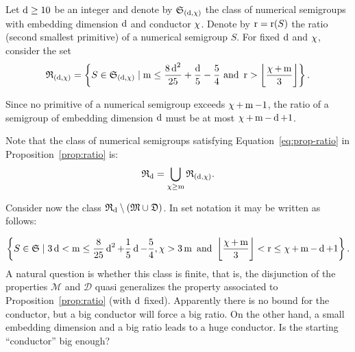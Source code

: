 Let $\operatorname{d}\ge 10$ be an integer and denote by $\mathfrak{S}_{(\operatorname{d},\operatorname{\chi})}$ the class of numerical semigroups with embedding dimension $\operatorname{d}$ and conductor $\operatorname{\chi}$. Denote by $\operatorname{r}=\operatorname{r}(S)$ the ratio (second smallest primitive) of a numerical semigroup $S$. For fixed $\operatorname{d}$ and $\operatorname{\chi}$, consider the set 
\[\mathfrak{R}_{(\operatorname{d},\operatorname{\chi})}=\left\{S\in \mathfrak{S}_{(\operatorname{d},\operatorname{\chi})}\mid \operatorname{m} \le \frac{8\operatorname{d}^2}{25}+\frac{\operatorname{d}}{5}-\frac{5}{4}\text{ and } \operatorname{r} >\left\lfloor\frac{\operatorname{\chi}+\operatorname{m}}{3}\right\rfloor\right\}.\]

Since no primitive of a numerical semigroup exceeds $\operatorname{\chi}+\operatorname{m}-1$, the ratio of a semigroup of embedding dimension $\operatorname{d}$ must be at most  $\operatorname{\chi}+\operatorname{m}-\operatorname{d}+1$.

Note that the class of numerical semigroups satisfying Equation~\ref{eq:prop-ratio} in Proposition~\ref{prop:ratio} is: \[\mathfrak{R}_{\operatorname{d}}=\bigcup_{\operatorname{\chi}\ge\operatorname{m}}\mathfrak{R}_{(\operatorname{d},\operatorname{\chi})}.\]

Consider now the class $\mathfrak{R}_{\operatorname{d}}\setminus(\mathfrak{M}\cup \mathfrak{D})$. In set notation it may be written as follows:

\[\left\{S\in \mathfrak{S}\mid 3\operatorname{d} < \operatorname{m} \le \frac{8}{25}\operatorname{d}^2+\frac{1}{5}\operatorname{d}-\frac{5}{4}, \operatorname{\chi} > 3\operatorname{m} \text{ and } \left\lfloor\frac{\operatorname{\chi}+\operatorname{m}}{3}\right\rfloor<\operatorname{r} \le \operatorname{\chi}+\operatorname{m}-\operatorname{d}+1\right\}.\]
A natural question is whether this class is finite, that is, the disjunction of the properties $\mathcal{M}$ and $\mathcal{D}$ quasi generalizes the property associated to Proposition~\ref{prop:ratio} (with $\operatorname{d}$ fixed).
Apparently there is no bound for the conductor, but a big conductor will force a big ratio. On the other hand, a small embedding dimension and a big ratio leads to a huge conductor. Is the starting ``conductor'' big enough?

 
 
 
 
 
   

